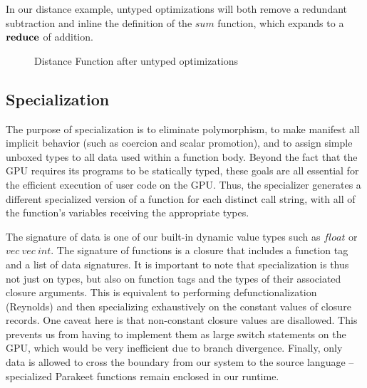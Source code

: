 \documentclass[preprint]{sigplanconf}
\begin{document}
In our distance example, untyped optimizations will both remove a redundant subtraction and inline the definition of the $sum$ function, which expands to a $\mbox{\textbf{reduce}}$ of addition.
\begin{figure}[h!]
\caption{Distance Function after untyped optimizations}
\end{figure}

\subsection{Specialization}
The purpose of specialization is to eliminate polymorphism, to make manifest all implicit behavior (such as coercion and scalar promotion), and to assign simple unboxed types to all data used within a function body. Beyond the fact that the GPU requires its programs to be statically typed, these goals are all essential for the efficient execution of user code on the GPU. Thus, the specializer generates a different specialized version of a function for each distinct call string, with all of the function's
variables receiving the appropriate types.

The signature of data is one of our built-in dynamic value types such as $float$ or $vec~vec~int$.  The signature of functions is a closure that includes a function tag and a list of data signatures.  It is important to note that specialization is thus not just on types, but also on function tags and the types of their associated closure arguments. This is equivalent to performing defunctionalization (Reynolds) and
then specializing exhaustively on the constant values of closure records. One caveat here is that non-constant closure values are disallowed.  This prevents us from having to implement them as large switch statements on the GPU, which would be very inefficient due to branch divergence.  Finally, only data is
allowed to cross the boundary from our system to the source language -- specialized Parakeet functions remain enclosed in our runtime.
\end{document}
